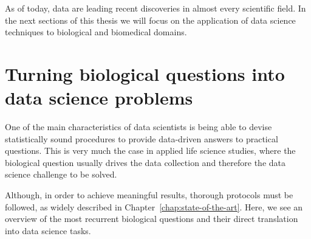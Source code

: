 As of today, data are leading recent discoveries in almost every scientific field. In the next sections of this thesis we will focus on the application of data science techniques to biological and biomedical domains.







%
%

\section{Turning biological questions into data science problems} \label{sec:clinical_to_data}
One of the main characteristics of data scientists is being able to devise statistically sound procedures to provide data-driven answers to practical questions. This is very much the case in applied life science studies, where the biological question usually drives the data collection and therefore the data science challenge to be solved.

Although, in order to achieve meaningful results, thorough protocols must be followed, as widely described in Chapter~\ref{chap:state-of-the-art}.
Here, we see an overview of the most recurrent biological questions and their direct translation into data science tasks.

